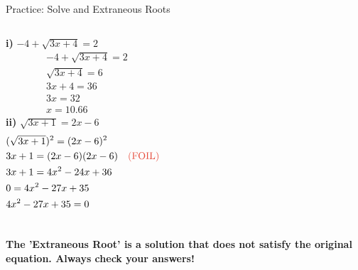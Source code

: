 \documentclass[aspectratio=169]{beamer}
\begin{document}
\begin{frame}{Practice: Solve and Extraneous Roots}
\begin{tcolorbox}[colback=lightgray,colframe=accent,title=Step-by-Step Example]
\footnotesize
\begin{columns}[T]
\textbf{i)} $-4+\sqrt{3x+4}=2$
\begin{align*}
  &-4+\sqrt{3x+4}=2 \\
  &\sqrt{3x+4}=6 \\
  &3x+4=36 \\
  &3x=32 \\
  &x=10.66
\end{align*}
\textbf{ii)} $\sqrt{3x+1}=2x-6$
\begin{align*}
  &(\sqrt{3x+1})^2=(2x-6)^2 \\
  &3x+1=(2x-6)(2x-6) \quad \textcolor{accent}{\text{(FOIL)}} \\
  &3x+1=4x^2-24x+36 \\
  &0=4x^2-27x+35 \\
  &4x^2-27x+35=0
\end{align*}
\end{columns}
\vspace{0.5em}
\textcolor{accent}{\textbf{The 'Extraneous Root' is a solution that does not satisfy the original equation. Always check your answers!}}
\end{tcolorbox}
\end{frame}
\end{document}
